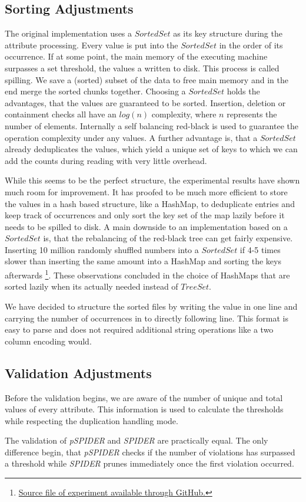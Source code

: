 \subsection{Sorting Adjustments}
The original implementation uses a $SortedSet$ as its key structure during the attribute processing. Every value is put into the $SortedSet$ in the order of its occurrence. If at some point, the main memory of the executing machine surpasses a set threshold, the values a written to disk. This process is called spilling. We save a (sorted) subset of the data to free main memory and in the end merge the sorted chunks together. Choosing a $SortedSet$ holds the advantages, that the values are guaranteed to be sorted. Insertion, deletion or containment checks all have an $log(n)$ complexity, where $n$ represents the number of elements. Internally a self balancing red-black is used to guarantee the operation complexity under any values. A further advantage is, that a $SortedSet$ already deduplicates the values, which yield a unique set of keys to which we can add the counts during reading with very little overhead.

\noindent \newline While this seems to be the perfect structure, the experimental results have shown much room for improvement. It has proofed to be much more efficient to store the values in a hash based structure, like a HashMap, to deduplicate entries and keep track of occurrences and only sort the key set of the map lazily before it needs to be spilled to disk. A main downside to an implementation based on a $SortedSet$ is, that the rebalancing of the red-black tree can get fairly expensive. Inserting 10 million randomly shuffled numbers into a $SortedSet$ if 4-5 times slower than inserting the same amount into a HashMap and sorting the keys afterwards \footnote{\href{https://github.com/Jakob-L-M/partial-inclusion-dependencies/blob/main/experiments/src/DataStructures.java}{Source file of experiment available through GitHub.}}. These observations concluded in the choice of HashMaps that are sorted lazily when its actually needed instead of $TreeSet$.

\noindent \newline We have decided to structure the sorted files by writing the value in one line and carrying the number of occurrences in to directly following line. This format is easy to parse and does not required additional string operations like a two column encoding would.


\subsection{Validation Adjustments}
Before the validation begins, we are aware of the number of unique and total values of every attribute. This information is used to calculate the thresholds while respecting the duplication handling mode.

\noindent \newline The validation of \textit{pSPIDER} and \textit{SPIDER} are practically equal. The only difference begin, that \textit{pSPIDER} checks if the number of violations has surpassed a threshold while \textit{SPIDER} prunes immediately once the first violation occurred.